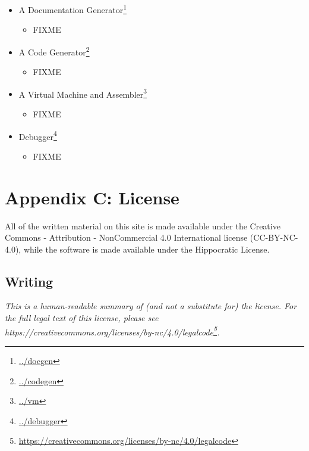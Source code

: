 \documentclass{scrbook}
\newcommand{\hreffoot}[2]{{#1}\footnote{\href{#2}{#2}}}
\begin{document}
\begin{itemize}
\item \hreffoot{A Documentation Generator}{../docgen}
\begin{itemize}

\item FIXME

\end{itemize}



\item \hreffoot{A Code Generator}{../codegen}
\begin{itemize}

\item FIXME

\end{itemize}



\item \hreffoot{A Virtual Machine and Assembler}{../vm}
\begin{itemize}

\item FIXME

\end{itemize}



\item \hreffoot{Debugger}{../debugger}
\begin{itemize}

\item FIXME

\end{itemize}



\end{itemize}

\chapter{Appendix C: License}\label{license}


All of the written material on this site is made available under the Creative
Commons - Attribution - NonCommercial 4.0 International license (CC-BY-NC-4.0),
while the software is made available under the Hippocratic License.

\section*{Writing}


\emph{This is a human-readable summary of (and not a substitute for) the license.
For the full legal text of this license, please see
\hreffoot{https://creativecommons.org/licenses/by-nc/4.0/legalcode}{https://creativecommons.org/licenses/by-nc/4.0/legalcode}.}
\end{document}
